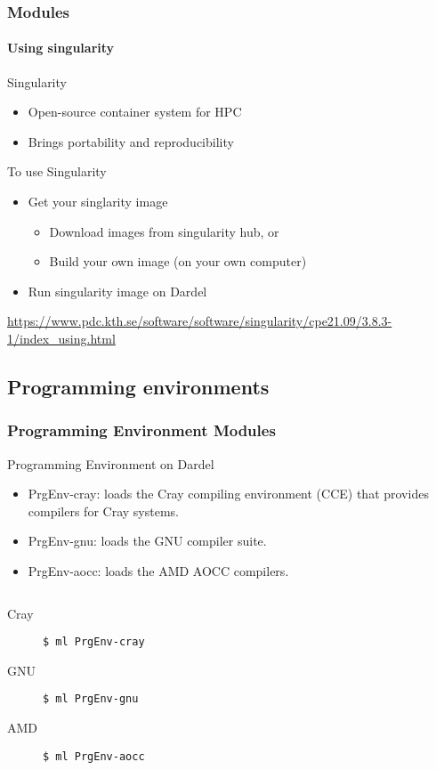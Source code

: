 \begin{frame}[fragile]
\frametitle{Modules}
\framesubtitle{Using singularity}
\begin{exampleblock}{Singularity}
\begin{itemize}
\item Open-source container system for HPC
\item Brings portability and reproducibility
\end{itemize}
\end{exampleblock}
\begin{exampleblock}{To use Singularity}
\begin{itemize}
\item Get your singlarity image
  \begin{itemize}
  \item Download images from singularity hub, or
  \item Build your own image (on your own computer)
  \end{itemize}
\item Run singularity image on Dardel
\end{itemize}
\end{exampleblock}
\scriptsize
    \href{https://www.pdc.kth.se/software/software/singularity/cpe21.09/3.8.3-1/index\_using.html}{https://www.pdc.kth.se/software/software/singularity/cpe21.09/3.8.3-1/index\_using.html}
\end{frame}


\subsection{Programming environments}

\begin{frame}[fragile]
\frametitle{Programming Environment Modules}
\begin{exampleblock}{Programming Environment on Dardel}
\begin{itemize}
  \item PrgEnv-cray:
    loads the Cray compiling environment (CCE) that provides compilers for Cray systems.
  \item PrgEnv-gnu:
    loads the GNU compiler suite.
  \item PrgEnv-aocc:
    loads the AMD AOCC compilers.
\end{itemize}
\end{exampleblock}
\begin{columns}[t]
\begin{description}
    \item [Cray] \verb|$ ml PrgEnv-cray|
    \item [GNU]  \verb|$ ml PrgEnv-gnu|
    \item [AMD]  \verb|$ ml PrgEnv-aocc|
\end{description}
\end{columns}
\end{frame}


